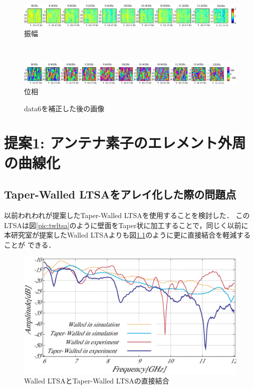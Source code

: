 ﻿\documentclass[12pt,oneside]{jsbook}
\begin{document}
\begin{figure}[hbtp]
 \begin{center}
     \begin{minipage}[c]{\hsize}
\includegraphics[width = \hsize ]{20150204_mine6_Bhosei_a.eps}
\centering\textmd{振幅}
  \end{minipage}
\\
     \begin{minipage}[c]{\hsize}
\includegraphics[width =\hsize ]{20150204_mine6_Bhosei_p.eps}
\centering\textmd{位相}
  \end{minipage}
\caption{data6を補正した後の画像}
\label{mine6-hosei}
 \end{center}
\end{figure}
\newpage
\chapter{提案1: アンテナ素子のエレメント外周の曲線化}
\section{Taper-Walled LTSAをアレイ化した際の問題点}
以前われわれが提案したTaper-Walled LTSAを使用することを検討した．
このLTSAは図\ref{pic:twltsa}のように壁面をTaper状に加工することで，同じく以前に
本研究室が提案したWalled LTSAよりも図\ref{pic:twltsa-dc}のように更に直接結合を軽減することが
できる\cite{2011Nakano}．

\begin{figure}[t]
\begin{center}
\includegraphics[width =\hsize]{walled-twalled.eps}
\caption{Walled LTSAとTaper-Walled LTSAの直接結合\cite{2011Nakano}} \label{pic:twltsa-dc} 
\end{center}
\end{figure}
\end{document}
